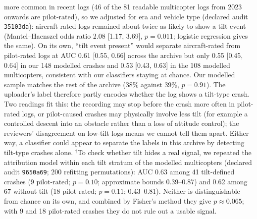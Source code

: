 \documentclass[preprint,12pt]{elsarticle}
\begin{document}
more common in recent logs (46 of the 81 readable multicopter logs from 2023 onwards are pilot-rated), so we adjusted for era and vehicle type (declared audit \texttt{35103da}): aircraft-rated logs remained about twice as likely to show a tilt event (Mantel--Haenszel odds ratio 2.08 [1.17, 3.69], $p=0.011$; logistic regression gives the same). On its own, ``tilt event present'' would separate aircraft-rated from pilot-rated logs at AUC 0.61 [0.55, 0.66] across the archive but only 0.55 [0.45, 0.64] in our 148 modelled crashes and 0.53 [0.43, 0.63] in the 108 modelled multicopters, consistent with our classifiers staying at chance. Our modelled sample matches the rest of the archive (38\% against 39\%, $p=0.91$). The uploader's label therefore partly encodes whether the log shows a tilt-type crash. Two readings fit this: the recording may stop before the crash more often in pilot-rated logs, or pilot-caused crashes may physically involve less tilt (for example a controlled descent into an obstacle rather than a loss of attitude control); the reviewers' disagreement on low-tilt logs means we cannot tell them apart. Either way, a classifier could appear to separate the labels in this archive by detecting tilt-type crashes alone. $^\dagger$To check whether tilt hides a real signal, we repeated the attribution model within each tilt stratum of the modelled multicopters (declared audit \texttt{9650a69}; 200 refitting permutations): AUC 0.63 among 41 tilt-defined crashes (9 pilot-rated; $p=0.10$; approximate bounds 0.39--0.87) and 0.62 among 67 without tilt (18 pilot-rated; $p=0.11$; 0.43--0.81). Neither is distinguishable from chance on its own, and combined by Fisher's method they give $p\approx0.065$; with 9 and 18 pilot-rated crashes they do not rule out a usable signal.
\end{document}
